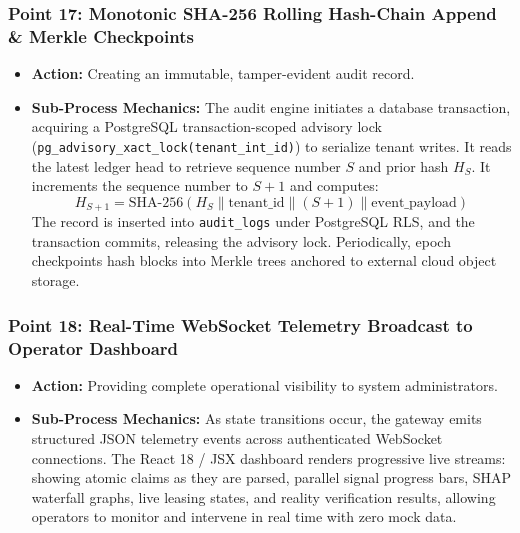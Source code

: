 \documentclass[11pt,a4paper]{article}
\begin{document}
\subsubsection*{Point 17: Monotonic SHA-256 Rolling Hash-Chain Append \& Merkle Checkpoints}
\begin{itemize}[leftmargin=*,itemsep=1pt]
  \item \textbf{Action:} Creating an immutable, tamper-evident audit record.
  \item \textbf{Sub-Process Mechanics:} The audit engine initiates a database transaction, acquiring a PostgreSQL transaction-scoped advisory lock (\texttt{pg\_advisory\_xact\_lock(tenant\_int\_id)}) to serialize tenant writes. It reads the latest ledger head to retrieve sequence number $S$ and prior hash $H_{S}$. It increments the sequence number to $S+1$ and computes:
  \begin{equation}
    H_{S+1} = \text{SHA-256}\left(H_S \parallel \text{tenant\_id} \parallel (S+1) \parallel \text{event\_payload}\right)
  \end{equation}
  The record is inserted into \texttt{audit\_logs} under PostgreSQL RLS, and the transaction commits, releasing the advisory lock. Periodically, epoch checkpoints hash blocks into Merkle trees anchored to external cloud object storage.
\end{itemize}

\subsubsection*{Point 18: Real-Time WebSocket Telemetry Broadcast to Operator Dashboard}
\begin{itemize}[leftmargin=*,itemsep=1pt]
  \item \textbf{Action:} Providing complete operational visibility to system administrators.
  \item \textbf{Sub-Process Mechanics:} As state transitions occur, the gateway emits structured JSON telemetry events across authenticated WebSocket connections. The React 18 / JSX dashboard renders progressive live streams: showing atomic claims as they are parsed, parallel signal progress bars, SHAP waterfall graphs, live leasing states, and reality verification results, allowing operators to monitor and intervene in real time with zero mock data.
\end{itemize}
\end{document}
